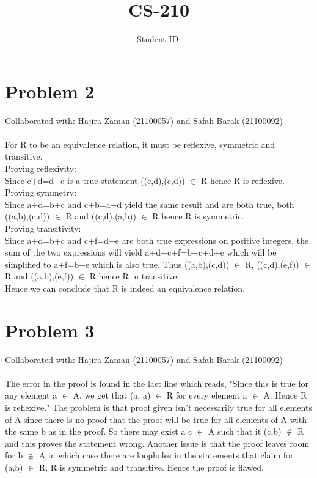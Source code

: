 \documentclass{article}
\title{CS-210 \hwNo}
\author{\myname \qquad Student ID: \myid}
\begin{document}
\maketitle

\section{Problem 2}
Collaborated with: Hajira Zaman (21100057) and Safah Barak (21100092)\\\\
For R to be an equivalence relation, it must be reflexive, symmetric and transitive. \\Proving reflexivity: \\Since c+d=d+c is a true statement ((c,d),(c,d)) $\in$ R hence R is reflexive. \\Proving symmetry: \\Since a+d=b+c and c+b=a+d yield the same result and are both true, both ((a,b),(c,d)) $\in$ R and ((c,d),(a,b)) $\in$ R hence R is symmetric. \\Proving transitivity: \\Since a+d=b+c and c+f=d+e are both true expressions on positive integers, the sum of the two expressions will yield a+d+c+f=b+c+d+e which will be simplified to a+f=b+e which is also true. Thus ((a,b),(c,d)) $\in$ R, ((c,d),(e,f)) $\in$ R and ((a,b),(e,f)) $\in$ R hence R in transitive.\\Hence we can conclude that R is indeed an equivalence relation.
\section{Problem 3}
Collaborated with: Hajira Zaman (21100057) and Safah Barak (21100092)\\\\
The error in the proof is found in the last line which reads, "Since this is true for any element a $\in$ A, we get that (a, a) $\in$ R for every element a $\in$ A. Hence R is reflexive." The problem is that proof given isn't necessarily true for all elements of A since there is no proof that the proof will be true for all elements of A with the same b as in the proof. So there may exist a c $\in$ A such that it (c,b) $\notin$ R and this proves the statement wrong. Another issue is that the proof leaves room for b $\notin$ A in which case there are loopholes in the statements that claim for (a,b) $\in$ R, R is symmetric and transitive. Hence the proof is flawed.
\end{document}

